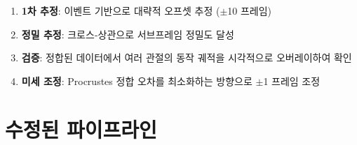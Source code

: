 \documentclass[11pt, a4paper]{report}
\begin{document}
\begin{solutionbox}[title={Strategy 3: 복합 접근 (최종 권장)}]
\begin{enumerate}[nosep]
  \item \textbf{1차 추정}: 이벤트 기반으로 대략적 오프셋 추정 ($\pm$10 프레임)
  \item \textbf{정밀 추정}: 크로스-상관으로 서브프레임 정밀도 달성
  \item \textbf{검증}: 정합된 데이터에서 여러 관절의 동작 궤적을 시각적으로 오버레이하여 확인
  \item \textbf{미세 조정}: Procrustes 정합 오차를 최소화하는 방향으로 $\pm$1 프레임 조정
\end{enumerate}
\end{solutionbox}


\chapter{수정된 파이프라인}
\label{ch:revised_pipeline}
\end{document}
